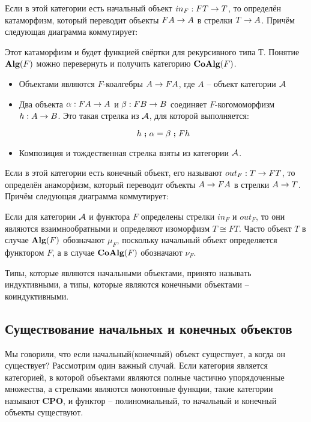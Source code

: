 Если в этой категории есть начальный объект $in_F : FT \rightarrow T$,
то определён катаморфизм, который переводит объекты $FA \rightarrow A$
в стрелки $T \rightarrow A$. Причём следующая диаграмма коммутирует:


Этот катаморфизм и будет функцией свёртки для рекурсивного
типа $Т$. Понятие $\textbf{Alg}(F)$  можно перевернуть и получить 
категорию $\textbf{CoAlg}(F)$.

\begin{itemize}
\item Объектами являются $F$-коалгебры $A \rightarrow FA$, где $A$ -- объект
    категории $\mathcal{A}$

\item Два объекта $\alpha : FA \rightarrow A$ и $\beta : FB \rightarrow B$ 
    соединяет $F$-когомоморфизм
    \mbox{$h : A \rightarrow B$}. Это такая стрелка из $\mathcal{A}$, для 
    которой выполняется:

\[  h \footnotesize\textbf{~;~}\normalsize \alpha = \beta \footnotesize\textbf{~;~}\normalsize Fh  \]

\item Композиция и тождественная стрелка взяты из категории $\mathcal{A}$.
\end{itemize}

Если в этой категории есть конечный объект, его называют 
$out_F : T \rightarrow FT$, то определён анаморфизм, который
переводит объекты $A \rightarrow FA$ в стрелки $A \rightarrow T$.  
Причём следующая диаграмма коммутирует:


Если для категории $\mathcal{A}$ и функтора
$F$ определены стрелки $in_F$  и $out_F$, то они
являются взаимнообратными и определяют изоморфизм $T \cong FT$.
Часто объект $T$ в случае $\textbf{Alg}(F)$ обозначают $\mu_F$, поскольку 
начальный объект определяется функтором $F$, а в случае $\textbf{CoAlg}(F)$
обозначают $\nu_F$. 

Типы, которые являются начальными объектами, принято 
называть индуктивными, а типы, которые являются конечными
объектами -- коиндуктивными. 

\subsection{Существование начальных и конечных объектов}

Мы говорили, что если начальный(конечный) объект существует,
а когда он существует? Рассмотрим один важный случай. 
Если категория является категорией, в которой объектами 
являются полные частично упорядоченные множества, а стрелками
являются монотонные функции, такие категории называют
$\textbf{CPO}$, и функтор -- полиномиальный,
то начальный и конечный объекты существуют.

